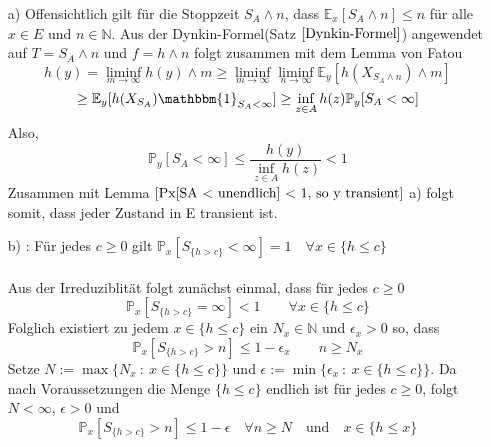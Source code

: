 \mbox{}
\begin{itemize}
\item[a)] Offensichtlich gilt für die Stoppzeit $S_{A} \wedge n$, dass $\mathbb{E}_{x}[S_{A} \wedge n] \leq n$ für alle $x \in E$ und $n \in \mathbb{N}$. Aus der Dynkin-Formel(Satz $\ref{Dynkin-Formel}$) angewendet auf $T = S_{A} \wedge n$ und $f = h \wedge n$ folgt zusammen mit dem Lemma von Fatou
\begin{equation*}
h(y) = \liminf_{m \to \infty} h(y) \wedge m \geq \liminf_{m \to \infty}
\liminf_{n \to \infty} \mathbb{E}_{y}[h(X_{S_{A} \wedge n}) \wedge m] 
\end{equation*}
\begin{equation*}
\geq \mathbb{E}_{y}[h(X_{S_{A}})\mathbbm{1}_{S_{A} < \infty}] \geq \inf_{z \in A} h(z) \mathbb{P}_{y}[S_{A} < \infty]
\end{equation*}
Also,
\begin{equation*}
\mathbb{P}_{y}[S_{A}< \infty] \leq \dfrac{h(y)}{\inf_{z \in A} h(z)} < 1
\end{equation*}
Zusammen mit Lemma $\ref{Px[SA < unendlich] < 1, so y transient}$ a) folgt somit, dass jeder Zustand in E transient ist.
\item[b)] : Für jedes $c \geq 0$ gilt $\mathbb{P}_{x}[S_{\lbrace h > c \rbrace} < \infty] = 1 \quad \forall x \in \lbrace h \leq c \rbrace$
\\
\\
Aus der Irreduziblität folgt zunächst einmal, dass für jedes $c \geq 0$
\begin{equation*}
\mathbb{P}_{x}[S_{\lbrace h > c \rbrace} = \infty] < 1 \qquad \forall x \in \lbrace h \leq c \rbrace
\end{equation*}
Folglich existiert zu jedem $x \in \lbrace h \leq c \rbrace$ ein $N_{x} \in \mathbb{N}$ und $\epsilon_{x} > 0$ so, dass
\begin{equation*}
\mathbb{P}_{x}[S_{\lbrace h > c \rbrace} > n] \leq 1 - \epsilon_{x} \qquad n \geq N_{x}
\end{equation*}
Setze $N := \max {\lbrace N_{x} \: : \: x \in {\lbrace h \leq c \rbrace}  \rbrace}$ und $\epsilon := \min \lbrace \epsilon_{x} \: : \: x \in \lbrace h \leq c \rbrace \rbrace$. Da nach Voraussetzungen die Menge $\lbrace h \leq c \rbrace$ endlich ist für jedes $c \geq 0$, folgt $N < \infty$, $\epsilon > 0$ und
\begin{equation*}
\mathbb{P}_{x}[S_{\lbrace h > c \rbrace} > n] \leq 1 - \epsilon \quad \forall n \geq N \quad \mathrm{und} \quad x \in {\lbrace h \leq x \rbrace}

\end{equation*}
\end{itemize}

